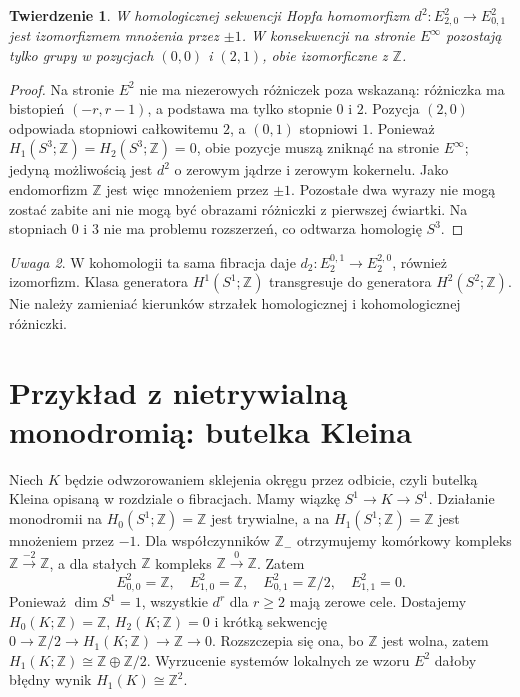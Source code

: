 \documentclass[11pt,a4paper,oneside]{report}
\newcommand{\Z}{\mathbb{Z}}
\theoremstyle{plain}
\newtheorem{twierdzenie}{Twierdzenie}[section]
\theoremstyle{definition}
\theoremstyle{remark}
\newtheorem{uwaga}[twierdzenie]{Uwaga}
\begin{document}
\begin{twierdzenie}
W homologicznej sekwencji Hopfa homomorfizm
$d^2:E^2_{2,0}\to E^2_{0,1}$ jest izomorfizmem
mnożenia przez $\pm1$. W konsekwencji na stronie
$E^\infty$ pozostają tylko grupy w pozycjach $(0,0)$
i $(2,1)$, obie izomorficzne z $\Z$.
\end{twierdzenie}
\begin{proof}
Na stronie $E^2$ nie ma niezerowych różniczek poza
wskazaną: różniczka ma bistopień $(-r,r-1)$,
a podstawa ma tylko stopnie $0$ i $2$.
Pozycja $(2,0)$ odpowiada stopniowi całkowitemu $2$,
a $(0,1)$ stopniowi $1$. Ponieważ
$H_1(S^3;\Z)=H_2(S^3;\Z)=0$, obie pozycje muszą
zniknąć na stronie $E^\infty$; jedyną możliwością
jest $d^2$ o zerowym jądrze i zerowym kokernelu.
Jako endomorfizm $\Z$ jest więc mnożeniem przez $\pm1$.
Pozostałe dwa wyrazy nie mogą zostać zabite ani nie mogą
być obrazami różniczki z pierwszej ćwiartki.
Na stopniach $0$ i $3$ nie ma problemu rozszerzeń,
co odtwarza homologię $S^3$.
\end{proof}
\begin{uwaga}
W kohomologii ta sama fibracja daje
$d_2:E_2^{0,1}\to E_2^{2,0}$, również izomorfizm.
Klasa generatora $H^1(S^1;\Z)$ transgresuje do generatora
$H^2(S^2;\Z)$. Nie należy zamieniać kierunków strzałek
homologicznej i kohomologicznej różniczki.
\end{uwaga}

\section{Przykład z nietrywialną monodromią: butelka Kleina}
Niech $K$ będzie odwzorowaniem sklejenia okręgu przez
odbicie, czyli butelką Kleina opisaną w rozdziale o fibracjach.
Mamy wiązkę $S^1\to K\to S^1$. Działanie monodromii
na $H_0(S^1;\Z)=\Z$ jest trywialne, a na
$H_1(S^1;\Z)=\Z$ jest mnożeniem przez $-1$.
Dla współczynników $\Z_-$ otrzymujemy komórkowy kompleks
$\Z\xrightarrow{-2}\Z$, a dla stałych $\Z$
kompleks $\Z\xrightarrow{0}\Z$. Zatem
\[
E^2_{0,0}=\Z,\quad E^2_{1,0}=\Z,\quad
E^2_{0,1}=\Z/2,\quad E^2_{1,1}=0.
\]
Ponieważ $\dim S^1=1$, wszystkie $d^r$ dla $r\ge2$
mają zerowe cele. Dostajemy $H_0(K;\Z)=\Z$,
$H_2(K;\Z)=0$ i krótką sekwencję
$0\to\Z/2\to H_1(K;\Z)\to\Z\to0$.
Rozszczepia się ona, bo $\Z$ jest wolna, zatem
$H_1(K;\Z)\cong\Z\oplus\Z/2$.
Wyrzucenie systemów lokalnych ze wzoru $E^2$ dałoby
błędny wynik $H_1(K)\cong\Z^2$.
\end{document}
